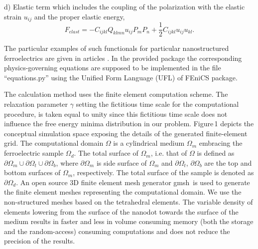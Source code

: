 \documentclass[%
preprint,
amsmath,amssymb,
aps
]{revtex4-2}
\begin{document}
d) Elastic  term  which includes the coupling of the polarization with the elastic strain $u_{ij}$ and the proper elastic energy,  
\begin{equation}
 F_{elast} = - C_{ijkl}Q_{klmn}u_{ij}P_{m}P_{n} + \frac{1}{2}C_{ijkl}u_{ij}u_{kl}. 
\label{Elast}
\end{equation} 


The particular examples of such functionals for particular nanostructured ferroelectrics are given in articles \cite{luk2020hopfions,tikhonov2020controllable,tikhonov2022polarization}. In the provided package the corresponding physics-governing equations are supposed to be implemented in the file ``equations.py'' using the Unified Form Language (UFL) of FEniCS package. 

The calculation method uses the finite element computation scheme. The relaxation parameter $\gamma$ setting the fictitious time scale for the computational procedure, is taken equal to unity since this fictitious time scale does not influence the free energy minima distribution in our problem.
 Figure\,1 depicts the conceptual simulation space exposing the details of the generated finite-element grid. The computational domain $\Omega$ is a cylindrical medium $\Omega_m$ embracing the ferroelectric sample $\Omega_d$. The total surface of $\Omega_m$, i.e. that of $\Omega$ is defined as $\partial\Omega_{m}\cup\partial\Omega_{t}\cup\partial\Omega_{b}$, where $\partial\Omega_{m}$ is side surface of $\Omega_{m}$ and $\partial\Omega_{t}$, $\partial\Omega_{b}$ are the top and bottom surfaces of $\Omega_{m}$, respectively. The total surface of the sample is denoted as $\partial\Omega_{d}$. 
An open source 3D finite element mesh generator gmsh\,\cite{Geuzaine2009} is used to generate the finite element meshes representing the computational domain. We use the non-structured meshes based on the tetrahedral elements. The variable density of elements lowering from the surface of the nanodot towards the surface of the medium results in faster and less in volume consuming memory (both the storage and the random-access) consuming computations and does not reduce the precision of the results.
\end{document}
